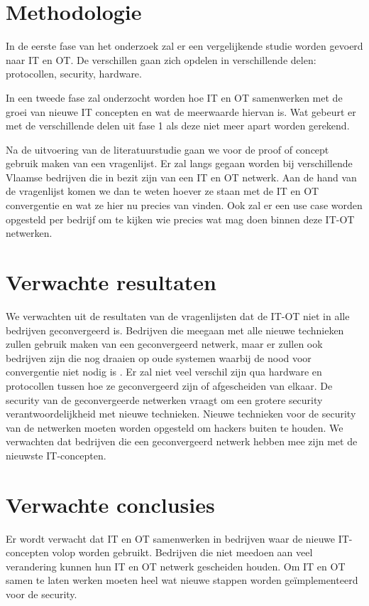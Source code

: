 \section{Methodologie}
\label{sec:methodologie}

In de eerste fase van het onderzoek zal er een vergelijkende studie worden gevoerd naar IT en OT. De verschillen gaan zich opdelen in verschillende delen: protocollen, security, hardware. 


In een tweede fase zal onderzocht worden hoe IT en OT samenwerken met de groei van nieuwe IT concepten en wat de meerwaarde hiervan is. Wat gebeurt er met de verschillende delen uit fase 1 als deze niet meer apart worden gerekend. 


Na de uitvoering van de literatuurstudie gaan we voor de proof of concept gebruik maken van een vragenlijst. Er zal langs gegaan worden bij verschillende Vlaamse bedrijven die in bezit zijn van een IT en OT netwerk. Aan de hand van de vragenlijst komen we dan te weten hoever ze staan met de IT en OT convergentie en wat ze hier nu precies van vinden. Ook zal er een use case worden opgesteld per bedrijf om te kijken wie precies wat mag doen binnen deze IT-OT netwerken. 




\section{Verwachte resultaten}
\label{sec:verwachte_resultaten}

We verwachten uit de resultaten van de vragenlijsten dat de IT-OT niet in alle bedrijven geconvergeerd is. Bedrijven die meegaan met alle nieuwe technieken zullen gebruik maken van een geconvergeerd netwerk, maar er zullen ook bedrijven zijn die nog draaien op oude systemen waarbij de nood voor convergentie niet nodig is \autocite{Berge2018}. Er zal niet veel verschil zijn qua hardware en protocollen tussen hoe ze geconvergeerd zijn of afgescheiden van elkaar. De security van de geconvergeerde netwerken vraagt om een grotere security verantwoordelijkheid met nieuwe technieken. Nieuwe technieken voor de security van de netwerken moeten worden opgesteld om hackers buiten te houden. We verwachten dat bedrijven die een geconvergeerd netwerk hebben mee zijn met de nieuwste IT-concepten. 


\section{Verwachte conclusies}
\label{sec:verwachte_conclusies}

Er wordt verwacht dat IT en OT samenwerken in bedrijven waar de nieuwe IT-concepten volop worden gebruikt. Bedrijven die niet meedoen aan veel verandering kunnen hun IT en OT netwerk gescheiden houden. Om IT en OT samen te laten werken moeten heel wat nieuwe stappen worden geïmplementeerd voor de security.

